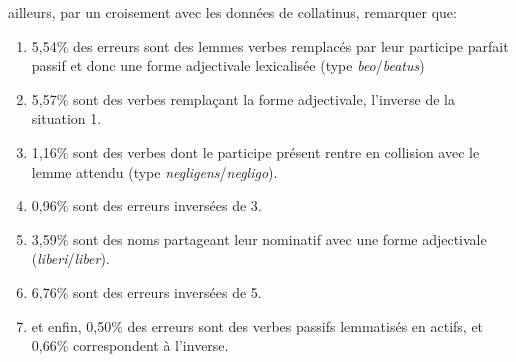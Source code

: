 ailleurs, par un croisement avec les données de collatinus, remarquer que:

\begin{enumerate}
    \item 5,54\% des erreurs sont des lemmes verbes remplacés par leur participe parfait passif et donc une forme adjectivale lexicalisée (type \textit{beo}/\textit{beatus})
    \item 5,57\% sont des verbes remplaçant la forme adjectivale, l'inverse de la situation 1.
    \item 1,16\% sont des verbes dont le participe présent rentre en collision avec le lemme attendu (type \textit{negligens}/\textit{negligo}).
    \item 0,96\% sont des erreurs inversées de 3.
    \item 3,59\% sont des noms partageant leur nominatif avec une forme adjectivale (\textit{liberi}/\textit{liber}).
    \item 6,76\% sont des erreurs inversées de 5.
    \item et enfin, 0,50\% des erreurs sont des verbes passifs lemmatisés en actifs, et 0,66\% correspondent à l'inverse.
\end{enumerate}

